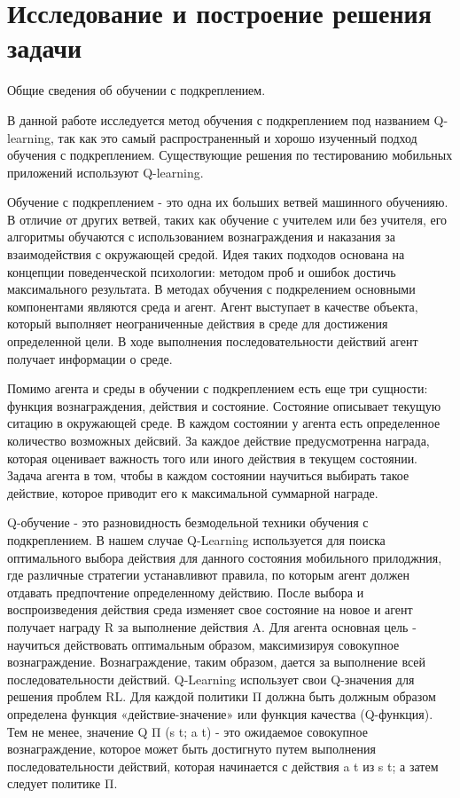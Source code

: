 \section{Исследование и построение решения задачи}
\label{sec:Chapter3} 

Общие сведения об обучении с подкреплением.

В данной работе исследуется метод обучения с подкреплением под названием Q-learning, так как это самый распространенный и хорошо изученный подход обучения с подкреплением. Существующие решения по тестированию мобильных приложений используют Q-learning.

Обучение с подкреплением - это одна их больших ветвей машинного обученияю. В отличие от других ветвей, таких как обучение с учителем или без учителя, его алгоритмы обучаются с использованием вознаграждения и наказания за взаимодействия с окружающей средой. Идея таких подходов основана на концепции поведенческой психологии: методом проб и ошибок достичь максимального результата. В методах обучения с подкрелением основными компонентами являются среда и агент. Агент выступает в качестве объекта, который выполняет неограниченные действия в среде для достижения определенной цели. В ходе выполнения последовательности действий агент получает информации о среде. 

Помимо агента и среды в обучении с подкреплением есть еще три сущности: функция вознаграждения, действия и состояние. Состояние описывает текущую ситацию в окружающей среде. В каждом состоянии у агента есть определенное количество возможных дейсвий. За каждое действие предусмотренна награда, которая оценивает важность того или иного действия в текущем состоянии. Задача агента в том, чтобы в каждом состоянии научиться выбирать такое действие, которое приводит его к максимальной суммарной награде.

Q-обучение - это разновидность безмодельной техники обучения с подкреплением. В нашем случае Q-Learning используется для поиска оптимального выбора действия для данного состояния мобильного прилоджния, где различные стратегии устанавливют правила, по которым агент должен отдавать предпочтение определенному действию. После выбора и воспроизведения действия среда изменяет свое состояние на новое и агент получает награду R за выполнение действия A. Для агента основная цель - научиться действовать оптимальным образом, максимизируя совокупное вознаграждение. Вознаграждение, таким образом, дается за выполнение всей последовательности действий.
Q-Learning использует свои Q-значения для решения проблем RL. Для каждой политики Π должна быть должным образом определена функция «действие-значение» или функция качества (Q-функция). Тем не менее, значение Q Π (s t; a t) - это ожидаемое совокупное вознаграждение, которое может быть достигнуто путем выполнения последовательности действий, которая начинается с действия a t из s t; а затем следует политике Π.





